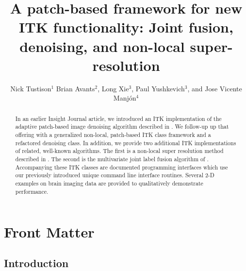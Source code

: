 \documentclass{InsightArticle}
\title{A patch-based framework for new ITK functionality:  Joint fusion, denoising,
and non-local super-resolution}
\author{Nick Tustison$^{1}$ Brian Avants$^{2}$, Long Xie$^{3}$, Paul Yushkevich$^{3}$, and Jose Vicente Manj\'on$^{4}$}
\newcommand{\IJhandlerIDnumber}{}
\begin{document}
%
%
\IJhandlefooter{\IJhandlerIDnumber}




\maketitle


\ifhtml
\chapter*{Front Matter\label{front}}
\fi


\begin{abstract}
\noindent
In an earlier Insight Journal article, we introduced an ITK implementation of the
adaptive patch-based image denoising algorithm described in \cite{Manjon:2010aa}.
We follow-up up that offering with a generalized non-local, patch-based ITK class
framework and a refactored denoising class.  In addition, we provide two additional
ITK implementations of related, well-known algorithms.  The first is a non-local
super resolution method described in \cite{Manjon:2010ab,Manjon:2010ac}.  The second is
the multivariate
joint label fusion algorithm of \cite{Wang:2013ab,Wang:2013aa}.  Accompanying these ITK classes are
documented programming interfaces which use our previously introduced unique
command line interface routines.  Several 2-D examples on brain imaging data are
provided to qualitatively demonstrate performance.
\end{abstract}

\IJhandlenote{\IJhandlerIDnumber}


\section{Introduction}
\end{document}
